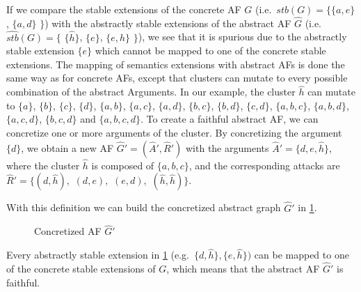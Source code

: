 If we compare the stable extensions of the concrete AF $G$ (i.e.\ 
$stb(G)=\bigl\{\{a, e\}$, $\{a, d\}$ $\bigl\}$) with the abstractly stable extensions of the abstract AF $\hat{G}$ (i.e.\ 
$\hat{stb}(G)=\bigl\{$ 
$\{\hat{h}\}$, 
$\{e\}$, 
$\{e, \hat{h}\}$ 
$\bigl\}$), 
we see that it is spurious due to the abstractly stable extension $\{e\}$ which cannot be mapped to one of the concrete stable extensions. The mapping of semantics extensions with abstract AFs is done the same way as for concrete AFs, except that clusters can mutate to every possible combination of the abstract Arguments. In our example, the cluster $\hat{h}$ can mutate to
$\{a\}$, 
$\{b\}$, 
$\{c\}$, 
$\{d\}$, 
$\{a, b\}$, 
$\{a, c\}$, 
$\{a, d\}$, 
$\{b, c\}$, 
$\{b, d\}$, 
$\{c, d\}$, 
$\{a, b, c\}$, 
$\{a, b, d\}$, 
$\{a, c, d\}$, 
$\{b, c, d\}$ and
$\{a, b, c, d\}$.
To create a faithful abstract AF, we can concretize one or more arguments of the cluster. By concretizing the argument $\{d\}$, we obtain a new AF $\hat{G}'=(\hat{A}', \hat{R}')$ with the arguments $\hat{A}'=\{d, e, \hat{h}\}$, where the cluster $\hat{h}$ is composed of $\{a, b, c\}$, and the corresponding attacks are $\hat{R}'=\{(d, \hat{h}),$
$(d, e),$
$(e, d),$
$(\hat{h}, \hat{h})\}$.

With this definition we can build the concretized abstract graph $\hat{G}'$ in \cref{af:backgroundClusterExample3}.


\begin{figure}[h]
    \centering
    \caption{Concretized AF $\hat{G}'$}
    \label{af:backgroundClusterExample3}
\end{figure}

Every abstractly stable extension in \cref{af:backgroundClusterExample3} (e.g.\ $\{d, \hat{h}\}, \{e, \hat{h}\})$ can be mapped to one of the concrete stable extensions of $G$, which means that the abstract AF $\hat{G}'$ is faithful.


